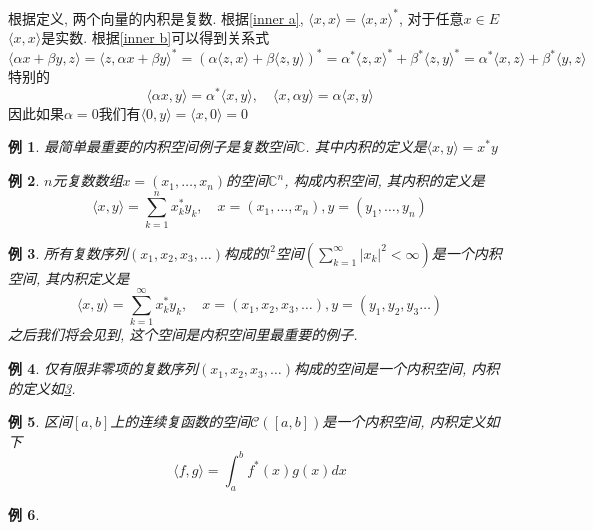 \documentclass{book}
\newtheorem{example}{例}[section]
\begin{document}
根据定义, 两个向量的内积是复数. 根据\ref{inner a}, $\langle x,x\rangle=\langle x,x\rangle^*$, 对于任意$x\in E$$\langle x,x\rangle$是实数. 根据\ref{inner b}可以得到关系式
\begin{equation*}
  \langle\alpha x+\beta y,z\rangle=\langle z,\alpha x+\beta y\rangle^*=(\alpha\langle z,x\rangle+\beta\langle z,y\rangle)^*=\alpha^*\langle z,x\rangle^*+\beta^*\langle z,y\rangle^*=\alpha^*\langle x,z\rangle+\beta^*\langle y,z\rangle
\end{equation*}
特别的
\begin{equation*}
  \langle\alpha x,y\rangle=\alpha^*\langle x,y\rangle,\quad \langle x,\alpha y\rangle=\alpha\langle x,y\rangle
\end{equation*}
因此如果$\alpha=0$我们有$\langle 0,y\rangle=\langle x,0\rangle=0$
\begin{example}
  最简单最重要的内积空间例子是复数空间$\mathbb{C}$. 其中内积的定义是$\langle x,y\rangle=x^*y$
\end{example}
\begin{example}
  $n$元复数数组$x=(x_1,\dots,x_n)$的空间$\mathbb{C}^n$, 构成内积空间, 其内积的定义是
  \begin{equation*}
    \langle x,y\rangle=\sum_{k=1}^{n}x_k^* y_k,\quad x=(x_1,\dots,x_n),y=(y_1,\dots,y_n)
  \end{equation*}
\end{example}
\begin{example}\label{l^2 inner space}
  所有复数序列$(x_1,x_2,x_3,\dots)$构成的$l^2$空间$(\sum_{k=1}^{\infty}|x_k|^2<\infty)$是一个内积空间, 其内积定义是
  \begin{equation*}
    \langle x,y\rangle=\sum_{k=1}^{\infty}x_k^*y_k,\quad x=(x_1,x_2,x_3,\dots),y=(y_1,y_2,y_3\dots)
  \end{equation*}
  之后我们将会见到, 这个空间是内积空间里最重要的例子.
\end{example}
\begin{example}\label{nonzero term}
  仅有限非零项的复数序列$(x_1,x_2,x_3,\dots)$构成的空间是一个内积空间, 内积的定义如\ref{l^2 inner space}.
\end{example}
\begin{example}\label{C[a,b]inner}
  区间$[a,b]$上的连续复函数的空间$\mathcal{C}([a,b])$是一个内积空间, 内积定义如下
  \begin{equation*}
    \langle f,g\rangle=\int_{a}^{b}f^*(x)g(x)dx
  \end{equation*}
\end{example}
\begin{example}

\end{example}$$
\end{document}
